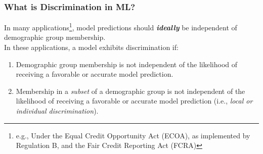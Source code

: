 \documentclass[11pt,aspectratio=169,hyperref={colorlinks}]{beamer}
\begin{document}
		\begin{frame}				
			
			\frametitle{What is Discrimination in ML?}
			
			\noindent In many applications\footnote{\small{e.g., Under the Equal Credit Opportunity Act (ECOA), as implemented by Regulation B, and the Fair Credit Reporting Act (FCRA})}, model predictions should \textbf{\textit{ideally}} be independent of demographic group membership.\\
			\vspace{5pt}
			\noindent In these applications, a model exhibits discrimination if:
			\begin{enumerate}
				\item Demographic group membership is not independent of the likelihood of receiving a favorable or accurate model prediction.
				\item Membership in a \textit{subset} of a demographic group is not independent of the likelihood of receiving a favorable or accurate model prediction (i.e., \textit{local or individual discrimination}).\cite{hall2019guidelines}
			\end{enumerate}
		
		\end{frame}
		
\end{document}
